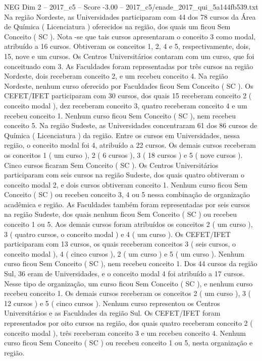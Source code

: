 \begin{textsample}{NEG Dim 2 – 2017\_c5 – Score -3.00 – 2017\_c5/enade\_2017\_qui\_5a144fb539.txt}
Na região Nordeste, as Universidades participaram com 44 dos 78 cursos da Área de Química ( Licenciatura ) oferecidos na região, dos quais um ficou Sem Conceito ( SC ).
Nota -se que tais cursos apresentaram o conceito 3 como modal, atribuído a 16 cursos.
Obtiveram os conceitos 1, 2, 4 e 5, respectivamente, dois, 15, nove e um cursos.
Os Centros Universitários contaram com um curso, que foi conceituado com 3.
As Faculdades foram representadas por três cursos na região Nordeste, dois receberam conceito 2, e um recebeu conceito 4.
Na região Nordeste, nenhum curso oferecido por Faculdades ficou Sem Conceito ( SC ).
Os CEFET/IFET participaram com 30 cursos, dos quais 15 receberam conceito 2 ( conceito modal ), dez receberam conceito 3, quatro receberam conceito 4 e um recebeu conceito 1.
Nenhum curso ficou Sem Conceito ( SC ), nem recebeu conceito 5.
Na região Sudeste, as Universidades concentraram 61 dos 86 cursos de Química ( Licenciatura ) da região.
Entre os cursos em Universidades, nessa região, o conceito modal foi 4, atribuído a 22 cursos.
Os demais cursos receberam os conceitos 1 ( um curso ), 2 ( 6 cursos ), 3 ( 18 cursos ) e 5 ( nove cursos ).
Cinco cursos ficaram Sem Conceito ( SC ).
Os Centros Universitários participaram com seis cursos na região Sudeste, dos quais quatro obtiveram o conceito modal 2, e dois cursos obtiveram conceito 1.
Nenhum curso ficou Sem Conceito ( SC ) ou recebeu conceito 3, 4 ou 5 nessa combinação de organização acadêmica e região.
As Faculdades também foram representadas por seis cursos na região Sudeste, dos quais nenhum ficou Sem Conceito ( SC ) ou recebeu conceito 1 ou 5.
Aos demais cursos foram atribuídos os conceitos 2 ( um curso ), 3 ( quatro cursos, o conceito modal ) e 4 ( um curso ).
Os CEFET/IFET participaram com 13 cursos, os quais receberam conceitos 3 ( seis cursos, o conceito modal ), 4 ( cinco cursos ), 2 ( um curso ) e 5 ( um curso ).
Nenhum curso ficou Sem Conceito ( SC ), nem recebeu conceito 1.
Dos 44 cursos da região Sul, 36 eram de Universidades, e o conceito modal 4 foi atribuído a 17 cursos.
Nesse tipo de organização, um curso ficou Sem Conceito ( SC ), e nenhum curso recebeu conceito 1.
Os demais cursos receberam os conceitos 2 ( um curso ), 3 ( 12 cursos ) e 5 ( cinco cursos ).
Nenhum curso representou os Centros Universitários e as Faculdades da região Sul.
Os CEFET/IFET foram representados por oito cursos na região, dos quais quatro receberam conceito 2 ( conceito modal ), três receberam conceito 3 e um recebeu conceito 4.
Nenhum curso ficou Sem Conceito ( SC ) ou recebeu conceito 1 ou 5, nesta organização e região.

\end{textsample}
